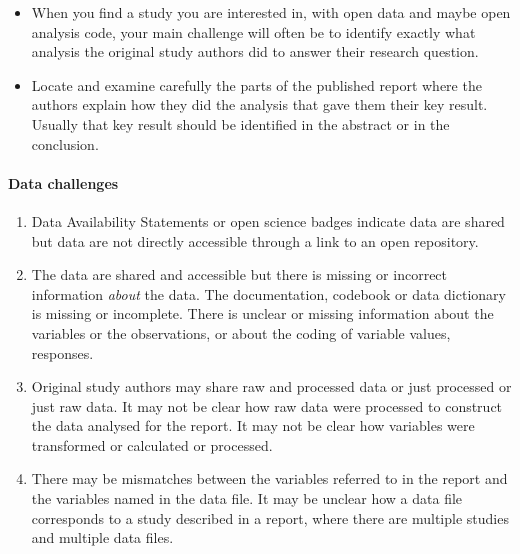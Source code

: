 \documentclass[
  letterpaper,
  DIV=11,
  numbers=noendperiod]{scrreprt}
\let\oldparagraph\paragraph
\renewcommand{\paragraph}[1]{\oldparagraph{#1}\mbox{}}
\providecommand{\tightlist}{%
  \setlength{\itemsep}{0pt}\setlength{\parskip}{0pt}}\usepackage{longtable,booktabs,array}
\begin{document}
\begin{tcolorbox}[enhanced jigsaw, opacitybacktitle=0.6, title=\textcolor{quarto-callout-tip-color}{\faLightbulb}\hspace{0.5em}{Tip}, arc=.35mm, colbacktitle=quarto-callout-tip-color!10!white, colframe=quarto-callout-tip-color-frame, leftrule=.75mm, opacityback=0, breakable, titlerule=0mm, left=2mm, bottomrule=.15mm, toprule=.15mm, colback=white, coltitle=black, bottomtitle=1mm, toptitle=1mm, rightrule=.15mm]

\begin{itemize}
\tightlist
\item
  When you find a study you are interested in, with open data and maybe
  open analysis code, your main challenge will often be to identify
  exactly what analysis the original study authors did to answer their
  research question.
\item
  Locate and examine carefully the parts of the published report where
  the authors explain how they did the analysis that gave them their key
  result. Usually that key result should be identified in the abstract
  or in the conclusion.
\end{itemize}

\end{tcolorbox}

\hypertarget{sec-datachallenges}{%
\paragraph{Data challenges}\label{sec-datachallenges}}

\begin{enumerate}
\def\labelenumi{\arabic{enumi}.}
\tightlist
\item
  Data Availability Statements or open science badges indicate data are
  shared but data are not directly accessible through a link to an open
  repository.
\item
  The data are shared and accessible but there is missing or incorrect
  information \emph{about} the data. The documentation, codebook or data
  dictionary is missing or incomplete. There is unclear or missing
  information about the variables or the observations, or about the
  coding of variable values, responses.
\item
  Original study authors may share raw and processed data or just
  processed or just raw data. It may not be clear how raw data were
  processed to construct the data analysed for the report. It may not be
  clear how variables were transformed or calculated or processed.
\item
  There may be mismatches between the variables referred to in the
  report and the variables named in the data file. It may be unclear how
  a data file corresponds to a study described in a report, where there
  are multiple studies and multiple data files.
\end{enumerate}
\end{document}
